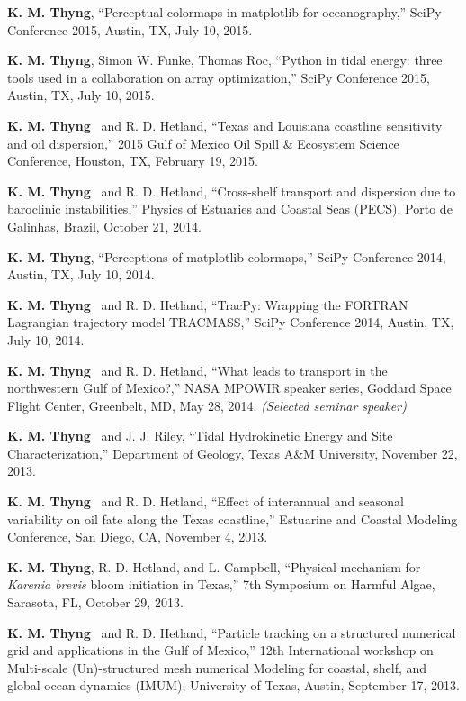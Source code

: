 \documentclass[10pt,letterpaper]{article}
\newcommand{\kmt}{\textbf{K. M. Thyng}}
\renewenvironment{itemize}{
  \begin{list}{}{
    \setlength{\leftmargin}{1.5em}
    \setlength{\itemsep}{0.25em}
    \setlength{\parskip}{0pt}
    \setlength{\parsep}{0.25em}
  }
}{
  \end{list}
}
\begin{document}
\begin{itemize}
\item \kmt, ``Perceptual colormaps in matplotlib for oceanography,'' SciPy Conference 2015, Austin, TX, July 10, 2015.

\item \kmt, Simon W. Funke, Thomas Roc, ``Python in tidal energy: three tools used in a collaboration on array optimization,'' SciPy Conference 2015, Austin, TX, July 10, 2015.

\item \kmt~ and R. D. Hetland, ``Texas and Louisiana coastline sensitivity and oil dispersion,'' 2015 Gulf of Mexico Oil Spill \& Ecosystem Science Conference, Houston, TX, February 19, 2015.

\item \kmt~ and R. D. Hetland, ``Cross-shelf transport and dispersion due to baroclinic instabilities,'' Physics of Estuaries and Coastal Seas (PECS), Porto de Galinhas, Brazil, October 21, 2014.

\item \kmt, ``Perceptions of matplotlib colormaps,'' SciPy Conference 2014, Austin, TX, July 10, 2014.

\item \kmt~ and R. D. Hetland, ``TracPy: Wrapping the FORTRAN Lagrangian trajectory model TRACMASS,'' SciPy Conference 2014, Austin, TX, July 10, 2014.

\item \kmt~ and R. D. Hetland, ``What leads to transport in the northwestern Gulf of Mexico?,'' NASA MPOWIR speaker series, Goddard Space Flight Center, Greenbelt, MD, May 28, 2014. \textit{(Selected seminar speaker)}

\item \kmt~ and J. J. Riley, ``Tidal Hydrokinetic Energy and Site Characterization,'' Department of Geology, Texas A\&M University, November 22, 2013.

\item \kmt~ and R. D. Hetland, ``Effect of interannual and seasonal variability on oil fate along the Texas coastline,'' Estuarine and Coastal Modeling Conference, San Diego, CA, November 4, 2013.

\item \kmt, R. D. Hetland, and L. Campbell, ``Physical mechanism for \textit{Karenia brevis} bloom initiation in Texas,'' 7th Symposium on Harmful Algae, Sarasota, FL, October 29, 2013.

\item \kmt~ and R. D. Hetland, ``Particle tracking on a structured numerical grid and applications in the Gulf of Mexico,'' 12th International workshop on Multi-scale (Un)-structured mesh numerical Modeling for coastal, shelf, and global ocean dynamics (IMUM), University of Texas, Austin, September 17, 2013.


\end{itemize}
\end{document}
